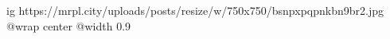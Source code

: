  
 
 
 
 

\ifcmt
  ig https://mrpl.city/uploads/posts/resize/w/750x750/bsnpxpqpnkbn9br2.jpg
  @wrap center
  @width 0.9
\fi

